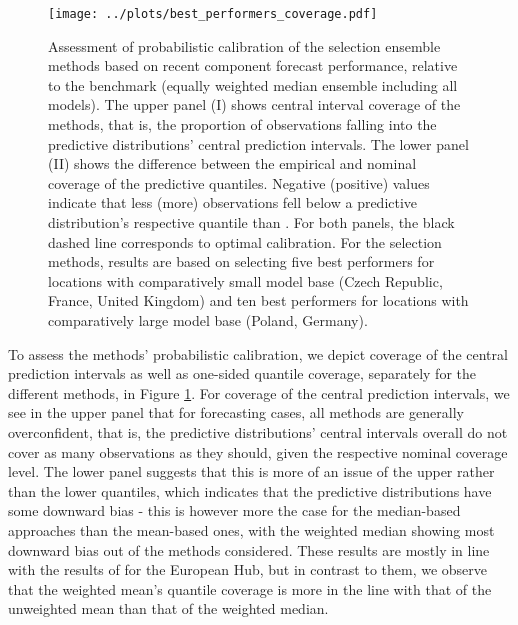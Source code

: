 \begin{figure}
\centering
\texttt{[image: ../plots/best\_performers\_coverage.pdf]}
\caption{Assessment of probabilistic calibration of the selection ensemble methods based on recent component forecast performance, relative to the benchmark (equally weighted median ensemble including all models). The upper panel (I) shows central interval coverage of the methods, that is, the proportion of observations falling into the predictive distributions' central prediction intervals. The lower panel (II) shows the difference between the empirical and nominal coverage of the predictive quantiles. Negative (positive) values indicate that less (more) observations fell below a predictive distribution's respective quantile than . For both panels, the black dashed line corresponds to optimal calibration. For the selection methods, results are based on selecting five best performers for locations with comparatively small model base (Czech Republic, France, United Kingdom) and ten best performers for locations with comparatively large model base (Poland, Germany).}
\label{fig:bpcoverage}
\end{figure}
To assess the methods' probabilistic calibration, we depict coverage of the central prediction intervals as well as one-sided quantile coverage, separately for the different methods, in Figure \ref{fig:bpcoverage}. For coverage of the central prediction intervals, we see in the upper panel that for forecasting cases, all methods are generally overconfident, that is, the predictive distributions' central intervals overall do not cover as many observations as they should, given the respective nominal coverage level. %
The lower panel suggests that this is more of an issue of the upper rather than the lower quantiles, which indicates that the predictive distributions have some downward bias - this is however more the case for the median-based approaches than the mean-based ones, with the weighted median showing most downward bias out of the methods considered. These results are mostly in line with the results of \cite{ray_comparing_2022} for the European Hub, but in contrast to them, we observe that the weighted mean's quantile coverage is more in the line with that of the unweighted mean than that of the weighted median.\\ 
